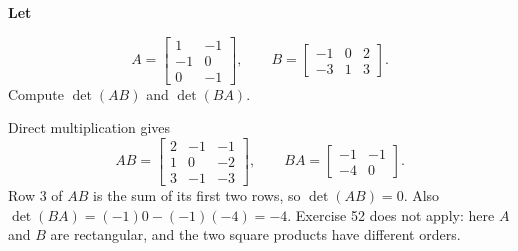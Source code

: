 \providecommand{\rank}{\operatorname{r}}
\providecommand{\RR}{\mathbb R}
\providecommand{\CC}{\mathbb C}
\providecommand{\KK}{\mathbb K}

\setcounter{enumi}{52}
\item {\bfseries\boldmath
Let
}

\[
A=\begin{bmatrix}1&-1\\-1&0\\0&-1\end{bmatrix},\qquad B=\begin{bmatrix}-1&0&2\\-3&1&3\end{bmatrix}.
\]
Compute $\det(AB)$ and $\det(BA)$.

\begin{answer}
Direct multiplication gives
\[
 AB=\begin{bmatrix}2&-1&-1\\1&0&-2\\3&-1&-3\end{bmatrix},\qquad
 BA=\begin{bmatrix}-1&-1\\-4&0\end{bmatrix}.
\]
Row $3$ of $AB$ is the sum of its first two rows, so $\det(AB)=0$.
Also $\det(BA)=(-1)0-(-1)(-4)=-4$.
Exercise 52 does not apply: here $A$ and $B$ are rectangular, and the two
square products have different orders.
\end{answer}
